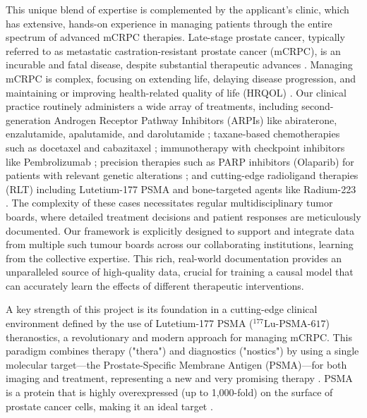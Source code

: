 \documentclass[11pt, a4paper]{article}
\begin{document}
This unique blend of expertise is complemented by the applicant's clinic, which has extensive, hands-on experience in managing patients through the entire spectrum of advanced mCRPC therapies. Late-stage prostate cancer, typically referred to as metastatic castration-resistant prostate cancer (mCRPC), is an incurable and fatal disease, despite substantial therapeutic advances \cite{FizaziHerrmann2023, HatanoNonomura2023}. Managing mCRPC is complex, focusing on extending life, delaying disease progression, and maintaining or improving health-related quality of life (HRQOL) \cite{FizaziHerrmann2023}. Our clinical practice routinely administers a wide array of treatments, including second-generation Androgen Receptor Pathway Inhibitors (ARPIs) like abiraterone, enzalutamide, apalutamide, and darolutamide \cite{FizaziHerrmann2023, HatanoNonomura2023, MaLi2022}; taxane-based chemotherapies such as docetaxel and cabazitaxel \cite{FizaziHerrmann2023, HatanoNonomura2023}; immunotherapy with checkpoint inhibitors like Pembrolizumab \cite{MaLi2022, RamnaraignSartor2023}; precision therapies such as PARP inhibitors (Olaparib) for patients with relevant genetic alterations \cite{HatanoNonomura2023, MaLi2022}; and cutting-edge radioligand therapies (RLT) including Lutetium-177 PSMA and bone-targeted agents like Radium-223 \cite{FizaziHerrmann2023, ChandranFigg2022, Keam2022}. The complexity of these cases necessitates regular multidisciplinary tumor boards, where detailed treatment decisions and patient responses are meticulously documented. Our framework is explicitly designed to support and integrate data from multiple such tumour boards across our collaborating institutions, learning from the collective expertise. This rich, real-world documentation provides an unparalleled source of high-quality data, crucial for training a causal model that can accurately learn the effects of different therapeutic interventions.

A key strength of this project is its foundation in a cutting-edge clinical environment defined by the use of Lutetium-177 PSMA (${}^{177}\text{Lu-PSMA-617}$) theranostics, a revolutionary and modern approach for managing mCRPC. This paradigm combines therapy ("thera") and diagnostics ("nostics") by using a single molecular target—the Prostate-Specific Membrane Antigen (PSMA)—for both imaging and treatment, representing a new and very promising therapy \cite{HennrichEder2022}. PSMA is a protein that is highly overexpressed (up to 1,000-fold) on the surface of prostate cancer cells, making it an ideal target \cite{HennrichEder2022, LingBlois2022}.
\end{document}
